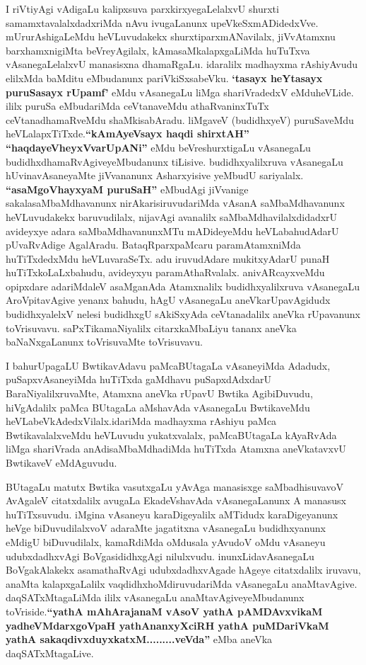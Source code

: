 \begin{artha}
I riVtiyAgi vAdigaLu kalipxsuva parxkirxyegaLelalxvU shurxti
samamxtavalalxdadxriMda nAvu ivugaLanunx
upeVkeSxmADidedxVve. mUrurAshigaLeMdu heVLuvudakekx
 shurxtiparxmANavilalx, jiVvAtamxnu barxhamxnigiMta beVreyAgilalx,
kAmasaMkalapxgaLiMda  huTuTxva vAsanegaLelalxvU manasisxna dhamaRgaLu.
idaralilx madhayxma rAshiyAvudu elilxMda baMditu eMbudanunx
pariVkiSxsabeVku. \textbf{`tasayx heYtasayx puruSasayx rUpamf'} eMdu vAsanegaLu liMga shariVradedxV
eMduheVLide. ililx puruSa eMbudariMda ceVtanaveMdu athaRvaninxTuTx
ceVtanadhamaRveMdu shaMkisabAradu. liMgaveV (budidhxyeV) puruSaveMdu
heVLalapxTiTxde.\textbf{``kAmAyeV\s sayx haqdi shirxtAH'' ``haqdayeVheyxVvarUpANi''} eMdu  beVreshurxtigaLu
vAsanegaLu budidhxdhamaRvAgiveyeMbudanunx
tiLisive. budidhxyalilxruva vAsanegaLu hUvinavAsaneyaMte jiVvananunx
Asharxyisive yeMbudU sariyalalx. \textbf{``asaMgoVhayxyaM puruSaH''} eMbudAgi jiVvanige
sakalasaMbaMdhavanunx nirAkarisiruvudariMda vAsanA saMbaMdhavanunx
heVLuvudakekx baruvudilalx, nijavAgi avanalilx saMbaMdhavilalxdidadxrU
avideyxye adara saMbaMdhavanunxMTu mADideyeMdu heVLabahudAdarU
pUvaRvAdige AgalAradu. BataqRparxpaMcaru paramAtamxniMda
huTiTxdedxMdu heVLuvaraSeTx. adu iruvudAdare mukitxyAdarU punaH
huTiTxkoLaLxbahudu, avideyxyu paramAthaRvalalx. anivARcayxveMdu
opipxdare adariMdaleV asaMganAda Atamxnalilx budidhxyalilxruva
vAsanegaLu AroVpitavAgive yenanx bahudu, hAgU vAsanegaLu
aneVkarUpavAgidudx budidhxyalelxV nelesi budidhxgU sAkiSxyAda
ceVtanadalilx aneVka rUpavanunx toVrisuvavu. saPxTikamaNiyalilx
citarxkaMbaLiyu tananx aneVka baNaNxgaLanunx toVrisuvaMte toVrisuvavu.
\end{artha}

\begin{artha}
I bahurUpagaLU BwtikavAdavu paMcaBUtagaLa vAsaneyiMda Adadudx,
puSapxvAsaneyiMda huTiTxda gaMdhavu puSapxdAdxdarU
BaraNiyalilxruvaMte, Atamxna aneVka rUpavU Bwtika AgibiDuvudu,
hiVgAdalilx paMca BUtagaLa aMshavAda vAsanegaLu BwtikaveMdu
heVLabeVkAdedxVilalx.idariMda madhayxma rAshiyu paMca BwtikavalalxveMdu
heVLuvudu yukatxvalalx, paMcaBUtagaLa kAyaRvAda liMga  shariVrada
anAdisaMbaMdhadiMda huTiTxda Atamxna aneVkatavxvU BwtikaveV eMdAguvudu.
\end{artha}

\centerline{}

\begin{artha}
BUtagaLu matutx Bwtika vasutxgaLu yAvAga manasisxge saMbadhisuvavoV
AvAgaleV citatxdalilx avugaLa EkadeVshavAda vAsanegaLanunx A manasusx
huTiTxsuvudu. iMgina vAsaneyu karaDigeyalilx aMTidudx karaDigeyanunx
heVge biDuvudilalxvoV adaraMte jagatitxna vAsanegaLu budidhxyanunx
eMdigU biDuvudilalx, kamaRdiMda oMdusala yAvudoV oMdu vAsaneyu
udubxdadhxvAgi BoVgasididhxgAgi  nilulxvudu. inunxLidavAsanegaLu
BoVgakAlakekx asamathaRvAgi udubxdadhxvAgade hAgeye citatxdalilx
iruvavu, anaMta kalapxgaLalilx vaqdidhxhoMdiruvudariMda vAsanegaLu
anaMtavAgive. daqSATxMtagaLiMda ililx vAsanegaLu
anaMtavAgiveyeMbudanunx toVriside.\textbf{``yathA mAhArajanaM vAsoV yathA pAMDAvxvikaM yadheVMdarxgoVpaH yathAnanxyXciRH yathA puMDariVkaM yathA sakaqdivxduyxkatxM.........veVda''} eMba aneVka
daqSATxMtagaLive.
\end{artha}

